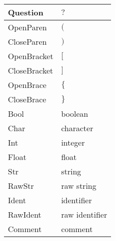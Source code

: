 \begin{longtable}{|p{4cm}| l |}
\hline
Question & $?$ \\
\hline
OpenParen & $($ \\
\hline
CloseParen & $)$ \\
\hline
OpenBracket & $[$ \\
\hline
CloseBracket & $]$ \\
\hline
OpenBrace & $\{$ \\
\hline
CloseBrace & $\}$ \\
\hline
Bool & boolean \\
\hline
Char & character \\
\hline
Int & integer \\
\hline
Float & float \\
\hline
Str & string \\
\hline
RawStr & raw string \\
\hline
Ident & identifier \\
\hline
RawIdent & raw identifier \\
\hline
Comment & comment \\
\hline
\end{longtable}
